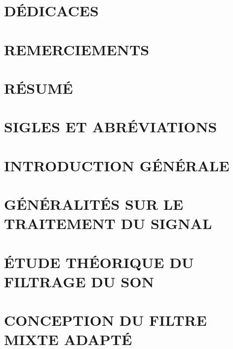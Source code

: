 \documentclass[12pt,twoside]{book}
\begin{document}
\begin{titlepage}

\end{titlepage}

\renewcommand{\bibname}{Bibliographie}
\renewcommand{\chaptername}{Chapitre}
\renewcommand{\appendixtocname}{ANNEXES}
\renewcommand{\appendixpagename}{ANNEXES}
\renewcommand{\contentsname}{Table des matières}
\renewcommand{\listfigurename}{Liste des figures}
\frontmatter
\chapter*{DÉDICACES}

\chapter*{REMERCIEMENTS}

\chapter*{RÉSUMÉ}

\chapter*{SIGLES ET ABRÉVIATIONS}

\tableofcontents
\listoffigures

\mainmatter
\chapter*{INTRODUCTION GÉNÉRALE}

\chapter{GÉNÉRALITÉS SUR LE TRAITEMENT DU SIGNAL}

\chapter{ÉTUDE THÉORIQUE DU FILTRAGE DU SON}

\chapter{CONCEPTION DU FILTRE MIXTE ADAPTÉ}

\end{document}
